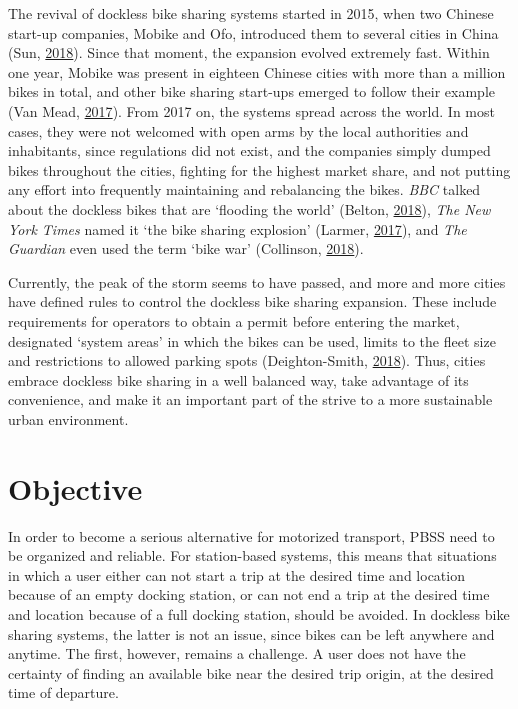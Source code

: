 \documentclass[12pt,oneside]{reedthesis}
\begin{document}
The revival of dockless bike sharing systems started in 2015, when two
Chinese start-up companies, Mobike and Ofo, introduced them to several
cities in China (Sun, \protect\hyperlink{ref-sun2018}{2018}). Since that
moment, the expansion evolved extremely fast. Within one year, Mobike
was present in eighteen Chinese cities with more than a million bikes in
total, and other bike sharing start-ups emerged to follow their example
(Van Mead, \protect\hyperlink{ref-guardian1}{2017}). From 2017 on, the
systems spread across the world. In most cases, they were not welcomed
with open arms by the local authorities and inhabitants, since
regulations did not exist, and the companies simply dumped bikes
throughout the cities, fighting for the highest market share, and not
putting any effort into frequently maintaining and rebalancing the
bikes. \emph{BBC} talked about the dockless bikes that are `flooding the
world' (Belton, \protect\hyperlink{ref-bbc}{2018}), \emph{The New York
Times} named it `the bike sharing explosion' (Larmer,
\protect\hyperlink{ref-nytimes}{2017}), and \emph{The Guardian} even
used the term `bike war' (Collinson,
\protect\hyperlink{ref-guardian2}{2018}).

Currently, the peak of the storm seems to have passed, and more and more
cities have defined rules to control the dockless bike sharing
expansion. These include requirements for operators to obtain a permit
before entering the market, designated `system areas' in which the bikes
can be used, limits to the fleet size and restrictions to allowed
parking spots (Deighton-Smith, \protect\hyperlink{ref-itf2018}{2018}).
Thus, cities embrace dockless bike sharing in a well balanced way, take
advantage of its convenience, and make it an important part of the
strive to a more sustainable urban environment.

\section{Objective}\label{objective}

In order to become a serious alternative for motorized transport, PBSS
need to be organized and reliable. For station-based systems, this means
that situations in which a user either can not start a trip at the
desired time and location because of an empty docking station, or can
not end a trip at the desired time and location because of a full
docking station, should be avoided. In dockless bike sharing systems,
the latter is not an issue, since bikes can be left anywhere and
anytime. The first, however, remains a challenge. A user does not have
the certainty of finding an available bike near the desired trip origin,
at the desired time of departure.
\end{document}
